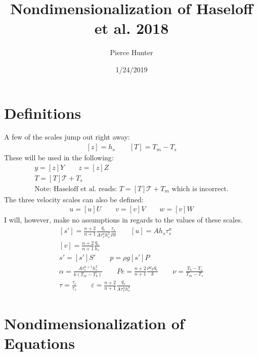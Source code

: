 \documentclass[10pt, letterpaper, twoside]{article}
\title{Nondimensionalization of Haseloff et al. 2018}
\author{Pierce Hunter}
\date{1/24/2019}
\begin{document}
	\maketitle
	\section{Definitions}
	A few of the scales jump out right away:
	\begin{gather*}
		\left[z\right] = h_s \qquad
		\left[T\right] = T_m-T_s
	\end{gather*}
	These will be used in the following:
	\begin{gather*}
		y = \left[z\right]Y \qquad
		z = \left[z\right]Z\\
		T = \left[T\right]\mathcal{T} + T_s\\
		\text{Note: Haseloff et al. reads: }T = \left[T\right]\mathcal{T} + T_m \text{ which is incorrect.}
	\end{gather*}
	The three velocity scales can also be defined:
	\begin{gather*}
		u = \left[u\right]U \qquad
		v = \left[v\right]V \qquad
		w = \left[v\right]W
	\end{gather*}
	I will, however, make no assumptions in regards to the values of these scales.
	\begin{gather*}
		\left[s'\right] = \frac{n+2}{n+1}\frac{q_r}{A\tau_s^nh_s^2}\frac{\tau_s}{\rho g} \qquad
		\left[u\right] = Ah_s\tau_s^n\\
		\left[v\right] = \frac{n+2}{n+1}\frac{q_r}{h_s}\\
		s' = \left[s'\right]S' \qquad
		p = \rho g \left[s'\right]P\\
		\alpha = \frac{A\tau_s^{n+1}h_s^2}{k\left(T_m-T_b\right)} \qquad
		Pe = \frac{n+2}{n+1}\frac{\rho c_pq_r}{k} \qquad
		\nu = \frac{T_b-T_s}{T_m-T_s}\\
		\tau = \frac{\tau_c}{\tau_s} \qquad
		\varepsilon = \frac{n+2}{n+1}\frac{q_r}{A\tau_s^nh_s^2}
	\end{gather*}
	
	\section{Nondimensionalization of Equations}
\end{document}
